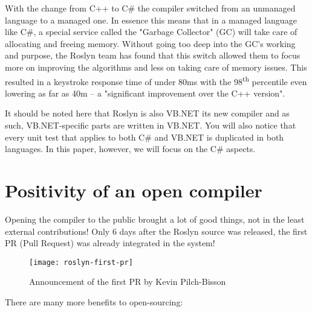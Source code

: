 With the change from C++ to C\# the compiler switched from an unmanaged language to a managed one. In essence this means that in a managed language like C\#, a special service called the "Garbage Collector" (GC) will take care of allocating and freeing memory. Without going too deep into the GC's working and purpose, the Roslyn team has found that this switch allowed them to focus more on improving the algorithms and less on taking care of memory issues. This resulted in a keystroke response time of under 80ms with the 98\textsuperscript{th} percentile even lowering as far as 40m -- a "significant improvement over the C++ version".\parencite{Wischik2014}

It should be noted here that Roslyn is also VB.NET its new compiler and as such, VB.NET-specific parts are written in VB.NET. You will also notice that every unit test that applies to both C\# and VB.NET is duplicated in both languages. In this paper, however, we will focus on the C\# aspects.

\section{Positivity of an open compiler}
\label{sec:intro-pos-comp}

Opening the compiler to the public brought a lot of good things, not in the least external contributions! Only 6 days after the Roslyn source was released, the first PR (Pull Request) was already integrated in the system!

\begin{figure}[h]
\centering
\texttt{[image: roslyn-first-pr]}
\caption[Announcement of the first PR by Kevin Pilch-Bisson]{Announcement of the first PR by Kevin Pilch-Bisson\protect\footnotemark}
\end{figure}


There are many more benefits to open-sourcing:

